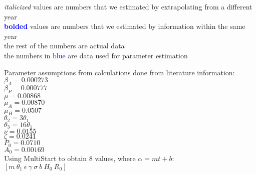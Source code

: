 \documentclass[12pt]{article}
\begin{document}
\begin{sidewaystable}
\textit{italicized} values are numbers that we estimated by extrapolating from a different year \\
 \textbf{\textcolor{blue}{bolded}} values are numbers that we estimated by information within the same year \\
 the rest of the numbers are actual data \\
 the numbers in \textcolor{blue}{blue} are data used for parameter estimation
\label{tab:template}
\end{sidewaystable} 

 
\pagebreak

Parameter assumptions from calculations done from literature information: \\
$\beta_A=0.000273$ \\
$\beta_P=0.000777$ \\
$\mu=0.00868$ \\
$\mu_{A}=0.00870$ \\
$\mu_{H}=0.0507$ \\
$\theta_2=3 \theta_1$ \\
$\theta_3=16\theta_1$ \\
$\nu=0.0155$ \\ 
$\zeta=0.0241$ \\
$P_0=0.0710$ \\
$A_0=0.00169$ \\

Using MultiStart to obtain 8 values, where $\alpha=mt+b$: \\
$[m \ \theta_1 \ \epsilon \ \gamma \ \sigma \  b \ H_0 \ R_0 ]$
\end{document}
